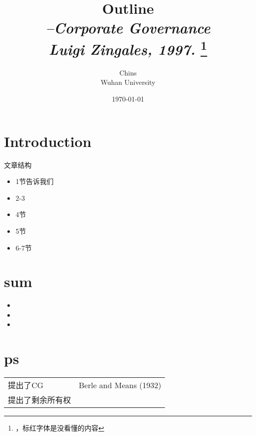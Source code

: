 \documentclass[a4paper]{article}
\title{Outline\\
\textit{	--Corporate Governance\\	
Luigi Zingales, 1997. }
\footnote{\citet{zingales1997}，标红字体是没看懂的内容}
}
\author{\vspace{1em}
	{\Large Chins}\\
	Wuhan University
}
\date{\today}
\begin{document}
\section{Introduction}
文章结构
\begin{itemize}
	\item 1节告诉我们
	\item 2-3
	\item 4节
	\item 5节
	\item 6-7节
\end{itemize}





\section{sum}%
\begin{itemize}
	\item 
	\item 
	\item 

\end{itemize}


\section*{ps}
\begin{tabular}{ll}
	提出了CG		& Berle and Means (1932) \\
	提出了剩余所有权& \citet{grossman1986}\\
	
\end{tabular}
\end{document}
